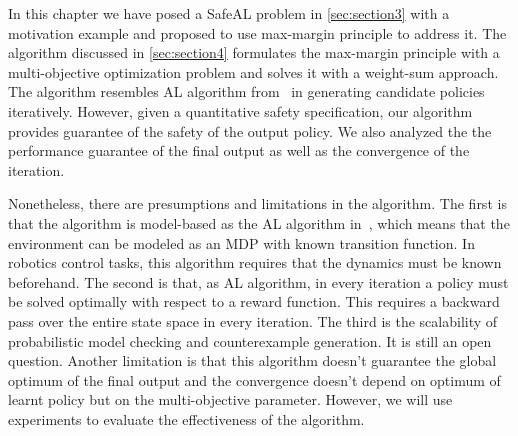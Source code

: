 In this chapter we have posed a SafeAL problem in \ref{sec:section3} with a motivation example and proposed to use max-margin principle to address it. The algorithm discussed in \ref{sec:section4} formulates the max-margin principle with a  multi-objective optimization problem and solves it with a weight-sum approach. The algorithm resembles AL algorithm from~\cite{Abbeel:2004:ALV:1015330.1015430} in generating candidate policies iteratively. However, given a quantitative safety specification, our algorithm provides guarantee of the safety of the output policy. We also analyzed the the performance guarantee of the final output as well as the convergence of the iteration.

Nonetheless, there are presumptions and limitations in the algorithm. The first is that the algorithm is model-based as the AL algorithm in~\cite{Abbeel:2004:ALV:1015330.1015430}, which means that the environment can be modeled as an MDP with known transition function. In robotics control tasks, this algorithm requires that the dynamics must be known beforehand. The second is that, as AL algorithm, in every iteration a policy must be solved optimally with respect to a reward function. This requires a backward pass over the entire state space in every iteration. The third is the scalability of probabilistic model checking and counterexample generation. It is still an open question. Another limitation is that this algorithm doesn't guarantee the global optimum of the final output and the convergence doesn't depend on optimum of learnt policy but on the multi-objective parameter. However, we will use experiments to evaluate the effectiveness of the algorithm.